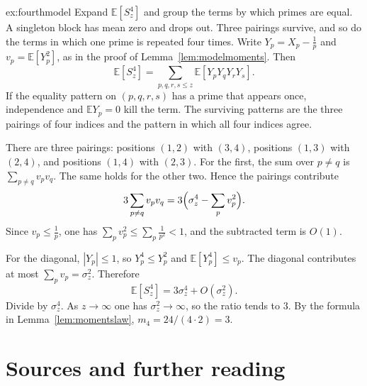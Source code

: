 \begin{solution}{ex:fourthmodel}
\idea Expand $\mathbb E[S_z^4]$ and group the terms by which primes are equal. A singleton block has mean zero and drops out. Three pairings survive, and so do the terms in which one prime is repeated four times.
\writeup Write $Y_p=X_p-\frac1p$ and $v_p=\mathbb E[Y_p^2]$, as in the proof of Lemma~\ref{lem:modelmoments}. Then
\[
\mathbb E[S_z^4]=\sum_{p,q,r,s\le z}\mathbb E[Y_p Y_q Y_r Y_s].
\]
If the equality pattern on $(p,q,r,s)$ has a prime that appears once, independence and $\mathbb E Y_p=0$ kill the term. The surviving patterns are the three pairings of four indices and the pattern in which all four indices agree.

There are three pairings: positions $(1,2)$ with $(3,4)$, positions $(1,3)$ with $(2,4)$, and positions $(1,4)$ with $(2,3)$. For the first, the sum over $p\ne q$ is $\sum_{p\ne q}v_pv_q$. The same holds for the other two. Hence the pairings contribute
\[
3\sum_{p\ne q}v_pv_q=3\Bigl(\sigma_z^4-\sum_pv_p^2\Bigr).
\]
Since $v_p\le\frac1p$, one has $\sum_pv_p^2\le\sum_p\frac1{p^2}<1$, and the subtracted term is $O(1)$.

For the diagonal, $|Y_p|\le1$, so $Y_p^4\le Y_p^2$ and $\mathbb E[Y_p^4]\le v_p$. The diagonal contributes at most $\sum_pv_p=\sigma_z^2$. Therefore
\[
\mathbb E[S_z^4]=3\sigma_z^4+O(\sigma_z^2).
\]
Divide by $\sigma_z^4$. As $z\to\infty$ one has $\sigma_z^2\to\infty$, so the ratio tends to $3$. By the formula in Lemma~\ref{lem:momentslaw}, $m_4=24/(4\cdot2)=3$.
\end{solution}

\section*{Sources and further reading}

